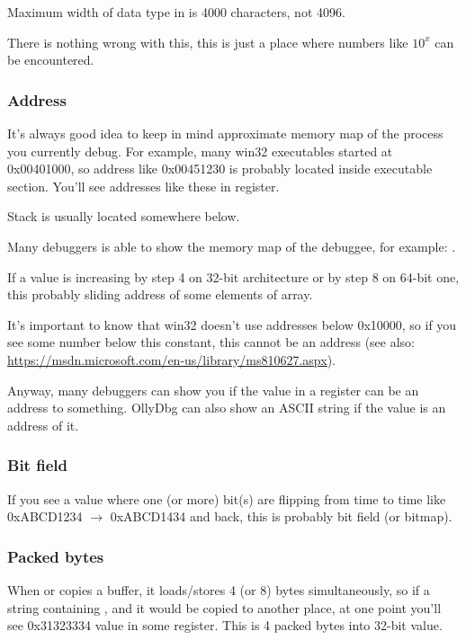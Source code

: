 Maximum width of  data type in \oracle is 4000 characters, not 4096.

There is nothing wrong with this, this is just a place where numbers like $10^x$ can be encountered.

\subsubsection{Address}

It's always good idea to keep in mind approximate memory map of the process you currently debug.
For example, many win32 executables started at 0x00401000, so address like 0x00451230 is probably located inside
executable section. You'll see addresses like these in  register.

Stack is usually located somewhere below. %

Many debuggers is able to show the memory map of the debuggee, for example: .

If a value is increasing by step 4 on 32-bit architecture or by step 8 on 64-bit one,
this probably sliding address of some elements of array.

It's important to know that win32 doesn't use addresses below 0x10000, so if you see some number below this constant,
this cannot be an address (see also: \url{https://msdn.microsoft.com/en-us/library/ms810627.aspx}).

Anyway, many debuggers can show you if the value in a register can be an address to something.
OllyDbg can also show an ASCII string if the value is an address of it.

\subsubsection{Bit field}

If you see a value where one (or more) bit(s) are flipping from time to time like 0xABCD1234 $\rightarrow$ 0xABCD1434 and back,
this is probably bit field (or bitmap).

\subsubsection{Packed bytes}

When  or  copies a buffer, it loads/stores 4 (or 8) bytes simultaneously,
so if a string containing , and it would be copied to another place,
at one point you'll see 0x31323334 value in some register.
This is 4 packed bytes into 32-bit value.

